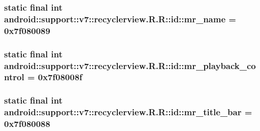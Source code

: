\hypertarget{classandroid_1_1support_1_1v7_1_1recyclerview_1_1_r_1_1id_a3ed9356a75a0b9f2f235e40147f2b2d}{
\subsubsection[{mr\_\-name}]{\setlength{\rightskip}{0pt plus 5cm}static final int android::support::v7::recyclerview.R.R::id::mr\_\-name = 0x7f080089}}
\label{classandroid_1_1support_1_1v7_1_1recyclerview_1_1_r_1_1id_a3ed9356a75a0b9f2f235e40147f2b2d}


\hypertarget{classandroid_1_1support_1_1v7_1_1recyclerview_1_1_r_1_1id_befdfa1f0a7de569317d0c0e71fb1686}{
\subsubsection[{mr\_\-playback\_\-control}]{\setlength{\rightskip}{0pt plus 5cm}static final int android::support::v7::recyclerview.R.R::id::mr\_\-playback\_\-control = 0x7f08008f}}
\label{classandroid_1_1support_1_1v7_1_1recyclerview_1_1_r_1_1id_befdfa1f0a7de569317d0c0e71fb1686}


\hypertarget{classandroid_1_1support_1_1v7_1_1recyclerview_1_1_r_1_1id_d03855cd335083d3762df4f0c5a61676}{
\subsubsection[{mr\_\-title\_\-bar}]{\setlength{\rightskip}{0pt plus 5cm}static final int android::support::v7::recyclerview.R.R::id::mr\_\-title\_\-bar = 0x7f080088}}
\label{classandroid_1_1support_1_1v7_1_1recyclerview_1_1_r_1_1id_d03855cd335083d3762df4f0c5a61676}


